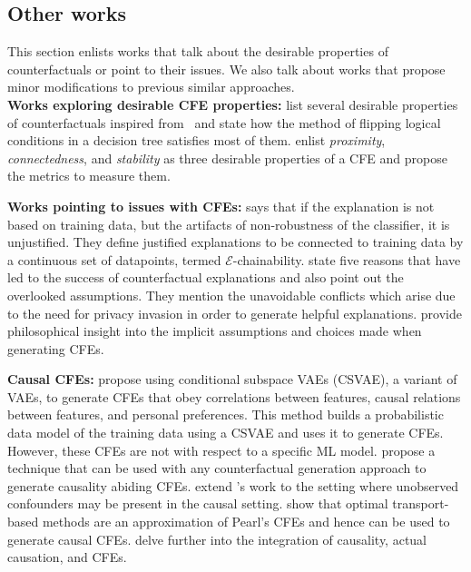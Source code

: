 \subsection{Other works}
\label{sec:other_works}
This section enlists works that talk about the desirable properties of counterfactuals or point to their issues. We also talk about works that propose minor modifications to previous similar approaches. \\

\textbf{Works exploring desirable CFE properties: }
\citet{sokol_desiderata_2019} list several desirable properties of counterfactuals inspired from~\citet{Miller-xai:2019} and state how the method of flipping logical conditions in a decision tree satisfies most of them. 
\citet{issues_posthoc} enlist \emph{proximity}, \emph{connectedness}, and \emph{stability} as three desirable properties of a CFE and propose the metrics to measure them. 


\textbf{Works pointing to issues with CFEs:} 
\citet{laugel_dangers_2019} says that if the explanation is not based on training data, but the artifacts of non-robustness of the classifier, it is unjustified.
They define justified explanations to be connected to training data by a continuous set of datapoints, termed $\mathcal{E}$-chainability. 
\citet{hidden_assumptions} state five reasons that have led to the success of counterfactual explanations and also point out the overlooked assumptions. They mention the unavoidable conflicts which arise due to the need for privacy invasion in order to generate helpful explanations. 
\citet{Atoosa-philosophy-cfe} provide philosophical insight into the implicit assumptions and choices made when generating CFEs. 


\textbf{Causal CFEs: } 
\citet{cruds_cf} propose using conditional subspace VAEs (CSVAE), a variant of VAEs, to generate CFEs that obey correlations between features, causal relations between features, and personal preferences. This method builds a probabilistic data model of the training data using a CSVAE and uses it to generate CFEs. However, these CFEs are not with respect to a specific ML model. 
\citet{cf-causal-latent-ontop} propose a technique that can be used with any counterfactual generation approach to generate causality abiding CFEs. 
\citet{bernhard-causal-cfe-confounded} extend \citet{karimi-imperfect:2020}'s work to the setting where unobserved confounders may be present in the causal setting. 
\citet{causality-from-transport-cfe} show that optimal transport-based methods are an approximation of Pearl's CFEs and hence can be used to generate causal CFEs. 
\citet{beckers-causal-xai} delve further into the integration of causality, actual causation, and CFEs. 

